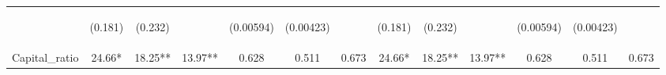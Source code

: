 \documentclass[]{article}
\begin{document}
\begin{center}
\begin{tabular}{lcccccccccccc}
\vspace{4pt} & \begin{footnotesize}(0.181)\end{footnotesize} & \begin{footnotesize}(0.232)\end{footnotesize} & \begin{footnotesize}\end{footnotesize} & \begin{footnotesize}(0.00594)\end{footnotesize} & \begin{footnotesize}(0.00423)\end{footnotesize} & \begin{footnotesize}\end{footnotesize} & \begin{footnotesize}(0.181)\end{footnotesize} & \begin{footnotesize}(0.232)\end{footnotesize} & \begin{footnotesize}\end{footnotesize} & \begin{footnotesize}(0.00594)\end{footnotesize} & \begin{footnotesize}(0.00423)\end{footnotesize} & \begin{footnotesize}\end{footnotesize} \\
Capital\_ratio & 24.66* & 18.25** & 13.97** & 0.628 & 0.511 & 0.673 & 24.66* & 18.25** & 13.97** & 0.628 & 0.511 & 0.673 \\

\end{tabular}
\end{center}
\end{document}
